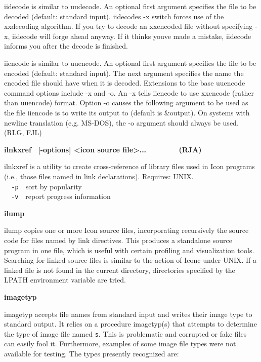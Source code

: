 {\textsf{iidecode} is similar to uudecode. An optional first argument
specifies the file to be decoded (default: standard input).
\textsf{iidecode}{\textquotesingle}s \textsf{{}-x} switch forces use of
the xxdecoding algorithm. If you try to decode an xxencoded file
without specifying \textsf{{}-x}, \textsf{iidecode} will forge ahead
anyway. If it thinks you{\textquotesingle}ve made a mistake,
\textsf{iidecode} informs you after the decode is finished.

\textsf{iiencode} is similar to uuencode. An optional first argument
specifies the file to be encoded (default: standard input). The next
argument specifies the name the encoded file should have when it is
decoded. Extensions to the base uuencode command options include
\textsf{{}-x} and \textsf{{}-o}. An \textsf{{}-x} tells
\textsf{iiencode} to use xxencode (rather than uuencode) format. Option
\textsf{{}-o} causes the following argument to be used as the file
\textsf{iiencode} is to write its output to (default is
\textsf{\&output}). On systems with newline translation (e.g. MS-DOS),
the \textsf{{}-o} argument should always be used. (RLG, FJL)

{\sffamily\bfseries
ilnkxref \ \textrm{\textmd{[-options] {\textless}icon source
file{\textgreater}...\ \ \ \ \ \ \ \ }}(RJA)}

\textsf{ilnkxref} is a utility to create
cross-reference of library files used in Icon
programs (i.e., those files named in link declarations).
Requires: UNIX.\\
\texttt{\ \ {}-p}\ \ sort by
{\textquotedbl}popularity{\textquotedbl}\\
\ \ \texttt{{}-v}\ \ report progress information

{\sffamily\bfseries
ilump}

\textsf{ilump} copies one or more Icon source files, incorporating
recursively the source code for files named by link
directives. This produces a standalone source program in one file,
which is useful with certain profiling and visualization tools.
Searching for linked source files is similar to the action of Iconc
under UNIX. If a linked file is not found in the current directory,
directories specified by the LPATH environment variable are tried.

{\sffamily\bfseries
imagetyp\ \ \ \ \ \ \ \ \ \ \ \ \ \ \ \ \ \ \ \ }

\textsf{imagetyp} accepts file names from standard input and writes
their image type to standard output. It relies on a procedure
\textsf{imagetyp(s)} that attempts to determine the type of image file
named \texttt{s}. This is problematic and corrupted or fake files can
easily fool it. Furthermore, examples of some image file types were not
available for testing. The types presently recognized are:

}
